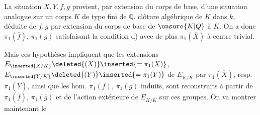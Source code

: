 
La situation $X,Y,f,g$ provient, par extension du corps de base, d'une situation analogue sur un corps $K$  de type fini de $\mathbb Q$.   clôture algébrique  de $K$ dans $k$,   déduite de  $f,g$ par extension du corps de base de $\unsure{K|Q}$ à $\overline K$. On a donc $\pi_1(\overline f)$, $\pi_1(\overline g)$ satisfaisant la condition d) avec de plus $\pi_1(\overline X)$ à centre trivial.

Mais ces hypothèses impliquent que les extensions $E_{\inserted{X/K}}\deleted{(X)}\inserted{=\pi_1(X)}$, $E_{\inserted{Y/K}}\deleted{(Y)}\inserted{=\pi_1(Y)}$ de $E_{\overline K/K}$ par $\pi_1(\overline X)$, resp. $\pi_1(\overline Y)$, ainsi que les hom. $\pi_1(f)$, $\pi_1(g)$ induits, sont reconstruits à partir de  $\pi_1(\overline f)$, $\pi_1(\overline g)$ et de l'action extérieure de $E_{\overline K/K}$ sur ces groupes. On va montrer maintenant le
